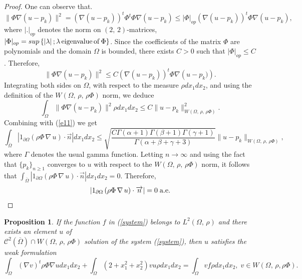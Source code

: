 \documentclass[11pt]{article}
\newtheorem{proposition}[theorem]{Proposition}
\begin{document}
\begin{proof}
		One can observe that.
		\begin{equation*}
			\|\Phi \nabla (u-p_k)\|^2=\left(\nabla \left(u-p_k\right)\right)^t\Phi^t\Phi\nabla (u-p_k)\leq \lvert \Phi\rvert_{op}\left(\nabla\left(u-p_k\right)\right)^t\Phi\nabla (u-p_k), 
		\end{equation*} 
		where $\lvert . \rvert_{op}$ denotes the norm on $(2,\,2)$-matrices,
		$|\Phi|_{op}=sup\left\{\left |\lambda\right|; \lambda\, {\rm eigenvalue\, of}\, \Phi\right\}$.
		Since the coefficients of the matrix $\Phi$ are polynomials and the domain $\Omega$ is bounded, there exists
		$C>0$ such that $\lvert \Phi\rvert_{op}\leq C$. Therefore,
		\begin{equation*}
			\|\Phi \nabla (u-p_k)\|^2\leq C\left(\nabla (u-p_k)\right)^t\Phi \nabla \left(u-p_k)\right).
		\end{equation*}
		Integrating both sides on $\Omega$, with respect to the measure $\rho dx_1dx_2$, and using the definition of the $W\left(\Omega,\,\rho,\,\rho\Phi\right)$ norm,  we deduce
		$$\int_{\Omega}\|\Phi \nabla (u-p_k)\|^2\rho dx_1dx_2\leq C\|u-p_k\|_{W\left(\Omega,\,\rho,\,\rho\Phi\right)}^2.$$ 
		Combining with (\ref{e11}) we get
			\begin{equation*}
				\int_{\overline{\Omega}}\left |1_{\partial\Omega}\left(\rho  \Phi\,\nabla\,u\right)\cdot\overrightarrow{n}\right |dx_1dx_2
				\leq \sqrt{\frac{C\Gamma(\alpha+1)\Gamma(\beta+1)\Gamma(\gamma+1)}{\Gamma(\alpha+\beta+\gamma+3)}} \|u-p_k\|_{W\left(\Omega,\,\rho ,\,\rho \Phi\right)},
		\end{equation*}
		where $\Gamma$ denotes the usual gamma function. Letting $n\to \infty$ and using the fact that {$\{p_k\}_{n \geq 1}$} converges to $u$ with respect to the  $W\left(\Omega,\,\rho ,\,\rho \Phi\right)$ norm, it follows that $\int_{\overline{\Omega}}\left |1_{\partial\Omega}\left(\rho  \Phi\,\nabla\,u\right)\cdot\overrightarrow{n}\right |dx_1dx_2=0$. 
		Therefore,
		$$\left |1_{\partial\Omega}\left(\rho  \Phi\,\nabla\,u\right)\cdot\overrightarrow{n}\right |=0\; {\rm a.e}.$$ 	  
	\end{proof}
	\begin{proposition} If the function $f$ in (\ref{system}) belongs to $L^2(\Omega,\,\rho)$ and there exists an element 
			$u$ of \\ $\mathcal{C}^2(\overline{\Omega})\cap W(\Omega,\,\rho,\,\rho\Phi)$ solution of the system (\ref{system}), then $u$ satisfies the weak formulation
			\begin{equation}\label{weakHelm}
				\int_{\Omega}(\nabla v)^t\rho \Phi\nabla udx_1dx_2+\int_{\Omega}\left(2+{x_1^2+x_2^2}\right)vu\rho dx_1dx_2=\int_{\Omega}vf\rho dx_1dx_2,\;v\in W(\Omega,\,\rho,\rho\Phi).
			\end{equation}
		\end{proposition}
\end{document}
